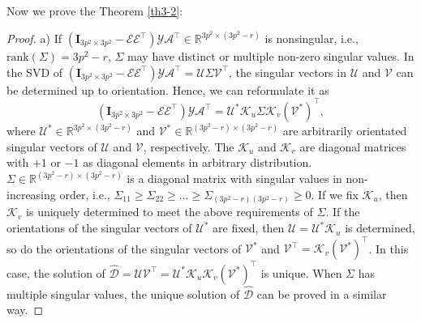 Now we prove the Theorem \ref{th3-2}:
\begin{proof} 
a) If $(\bm{I}_{3p^2\times 3p^2}-\mathcal{E}\mathcal{E}^{\top})\mathcal{Y}\mathcal{A}^{\top}\in\mathbb{R}^{3p^2\times (3p^2-r)}$ is nonsingular, i.e., $\text{rank}(\Sigma)=3p^2-r$, $\Sigma$ may have distinct or multiple non-zero singular values. In the SVD \cite{eckart1936approximation} of $(\bm{I}_{3p^2\times 3p^2}-\mathcal{E}\mathcal{E}^{\top})\mathcal{Y}\mathcal{A}^{\top}
=
\mathcal{U}\Sigma\mathcal{V}^{\top}$, the singular vectors in $\mathcal{U}$ and $\mathcal{V}$
can be determined up to orientation. Hence, we can reformulate it as 
\begin{equation}\label{equ8-14}
(\bm{I}_{3p^2\times 3p^2}-\mathcal{E}\mathcal{E}^{\top})\mathcal{Y}\mathcal{A}^{\top}
=
\mathcal{U}^{*}\mathcal{K}_{u}\Sigma\mathcal{K}_{v}(\mathcal{V}^{*})^{\top},
\end{equation}
where $\mathcal{U}^{*}\in \mathbb{R}^{3p^2\times (3p^2-r)}$ and $\mathcal{V}^{*}\in \mathbb{R}^{(3p^2-r)\times (3p^2-r)}$ are arbitrarily orientated singular vectors of $\mathcal{U}$ and $\mathcal{V}$, respectively. The $\mathcal{K}_{u}$ and $\mathcal{K}_{v}$ are diagonal matrices with $+1$ or $-1$ as diagonal elements in arbitrary distribution. $\Sigma\in \mathbb{R}^{(3p^2-r)\times (3p^2-r)}$ is a diagonal matrix with singular values in non-increasing order, i.e., $\Sigma_{11}\ge\Sigma_{22}\ge...\ge\Sigma_{(3p^2-r)(3p^2-r)}\ge0$. If we fix $\mathcal{K}_{u}$, then $\mathcal{K}_{v}$ is uniquely determined to meet the above requirements of $\Sigma$. If the orientations of the singular vectors of $\mathcal{U}^{*}$ are fixed, then $\mathcal{U}=\mathcal{U}^{*}\mathcal{K}_{u}$ is determined, so do the orientations of the singular vectors of $\mathcal{V}^{*}$ and $\mathcal{V}^{\top}=\mathcal{K}_{v}(\mathcal{V}^{*})^{\top}$. In this case, the solution of $\hat{\mathcal{D}}=\mathcal{U}\mathcal{V}^{\top}=\mathcal{U}^{*}\mathcal{K}_{u}\mathcal{K}_{v}(\mathcal{V}^{*})^{\top}$ is unique. When $\Sigma$ has multiple singular values, the unique solution of $\hat{\mathcal{D}}$ can be proved in a similar way. 


\end{proof}
